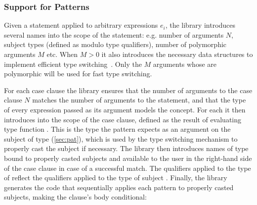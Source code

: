
\subsubsection{Support for Patterns}
\label{sec:patcases}

Given a statement  applied to arbitrary expressions $e_i$, the library introduces several 
names into the scope of the statement: e.g. number of arguments $N$, subject 
types  (defined as  modulo type 
qualifiers), number of polymorphic arguments $M$ etc. When $M > 0$ it also 
introduces the necessary data structures to implement efficient type 
switching~\cite{TS12}. Only the $M$ arguments whose  are 
polymorphic will be used for fast type switching.

For each case clause  the library ensures that the 
number of arguments to the case clause $N$ matches the number of arguments to 
the  statement, and that the type  of every expression 
 passed as its argument models the  concept. 
For each  it then introduces  into the 
scope of the case clause, defined as the result of evaluating type function 
. This is the type the pattern 
expects as an argument on the subject of type  (\textsection\ref{sec:pat}), 
which is used by the type switching mechanism to properly cast the subject if necessary. 
The library then introduces names  of type  
bound to properly casted subjects and available to the user in the right-hand 
side of the case clause in case of a successful match. The qualifiers applied to 
the type of  reflect the qualifiers applied to the type of subject 
. Finally, the library generates the code that sequentially applies 
each pattern to properly casted subjects, making the clause's body conditional:

